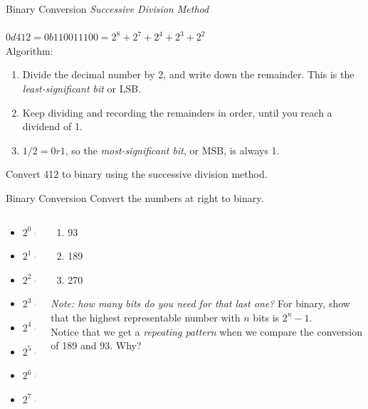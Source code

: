 \documentclass{beamer}
\begin{document}
\begin{frame}{Binary Conversion}
\textit{Successive Division Method} \\ \vspace{0.5cm} \hrulefill \\
$0d412 = 0b110011100 = 2^8 + 2^7 + 2^4 + 2^3 + 2^2$ \\
Algorithm:
\begin{enumerate}
\item Divide the decimal number by 2, and write down the remainder.  This is the \textit{least-significant bit} or LSB.
\item Keep dividing and recording the remainders in order, until you reach a dividend of 1.
\item $1/2 = 0 r 1$, so the \textit{most-significant bit}, or MSB, is always 1.
\end{enumerate}
Convert 412 to binary using the successive division method.
\end{frame}

\begin{frame}{Binary Conversion}
Convert the numbers at right to binary. \\ \vspace{1cm}
\begin{columns}[T]
\begin{column}{0.5\textwidth}
\begin{itemize}
\item $2^0 = 1$
\item $2^1 = 2$
\item $2^2 = 4$
\item $2^3 = 8$
\item $2^4 = 16$
\item $2^5 = 32$
\item $2^6 = 64$
\item $2^7 = 128$
\end{itemize}
\end{column}
\begin{column}{0.5\textwidth}
\small
\begin{enumerate}
\item 93
\item 189
\item 270
\end{enumerate}
\textit{Note: how many bits do you need for that last one?}  For binary, show that the highest representable number with $n$ bits is $2^n-1$. \\ \vspace{0.2cm}
Notice that we get a \textit{repeating pattern} when we compare the conversion of 189 and 93.  Why?
\end{column}
\end{columns}
\end{frame}
\end{document}
